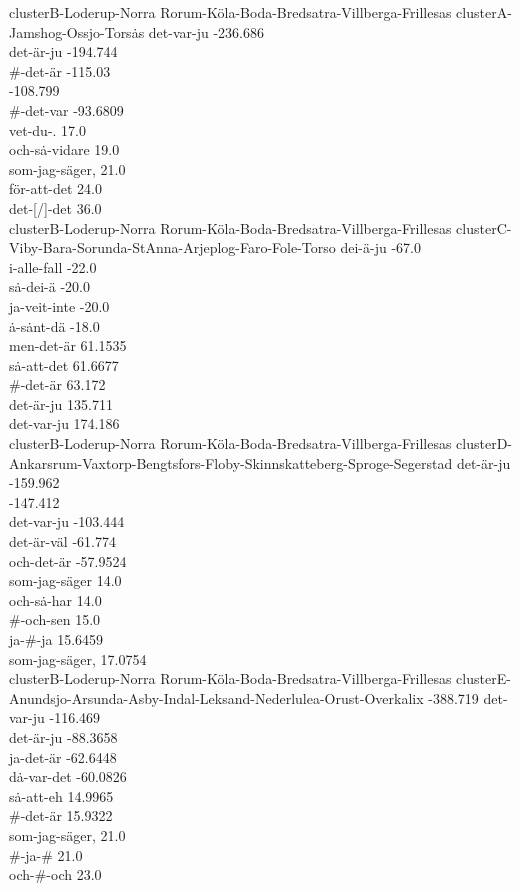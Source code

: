 clusterB-Loderup-Norra Rorum-K\"ola-Boda-Bredsatra-Villberga-Frillesas
clusterA-Jamshog-Ossjo-Tors\.as
det-var-ju -236.686 \\
det-\"ar-ju -194.744 \\
\#-det-\"ar -115.03 \\
 -108.799 \\
\#-det-var -93.6809 \\
vet-du-. 17.0 \\
och-s\.a-vidare 19.0 \\
som-jag-s\"ager, 21.0 \\
f\"or-att-det 24.0 \\
det-[/]-det 36.0 \\


clusterB-Loderup-Norra Rorum-K\"ola-Boda-Bredsatra-Villberga-Frillesas
clusterC-Viby-Bara-Sorunda-StAnna-Arjeplog-Faro-Fole-Torso
dei-\"a-ju -67.0 \\
i-alle-fall -22.0 \\
s\.a-dei-\"a -20.0 \\
ja-veit-inte -20.0 \\
\.a-s\.ant-d\"a -18.0 \\
men-det-\"ar 61.1535 \\
s\.a-att-det 61.6677 \\
\#-det-\"ar 63.172 \\
det-\"ar-ju 135.711 \\
det-var-ju 174.186 \\


clusterB-Loderup-Norra Rorum-K\"ola-Boda-Bredsatra-Villberga-Frillesas
clusterD-Ankarsrum-Vaxtorp-Bengtsfors-Floby-Skinnskatteberg-Sproge-Segerstad
det-\"ar-ju -159.962 \\
 -147.412 \\
det-var-ju -103.444 \\
det-\"ar-v\"al -61.774 \\
och-det-\"ar -57.9524 \\
som-jag-s\"ager 14.0 \\
och-s\.a-har 14.0 \\
\#-och-sen 15.0 \\
ja-\#-ja 15.6459 \\
som-jag-s\"ager, 17.0754 \\


clusterB-Loderup-Norra Rorum-K\"ola-Boda-Bredsatra-Villberga-Frillesas
clusterE-Anundsjo-Arsunda-Asby-Indal-Leksand-Nederlulea-Orust-Overkalix
 -388.719
det-var-ju -116.469 \\
det-\"ar-ju -88.3658 \\
ja-det-\"ar -62.6448 \\
d\.a-var-det -60.0826 \\
s\.a-att-eh 14.9965 \\
\#-det-\"ar 15.9322 \\
som-jag-s\"ager, 21.0 \\
\#-ja-\# 21.0 \\
och-\#-och 23.0 \\


